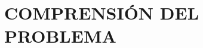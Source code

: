 \documentclass[../General.tex]{subfiles}
\begin{document}
\onehalfspacing
{}

\chapter{COMPRENSIÓN DEL PROBLEMA}










\end{document}
